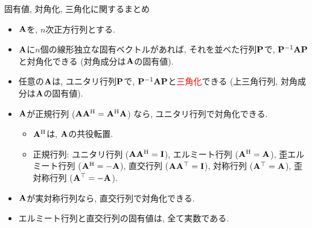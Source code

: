 \documentclass[dvipdfmx,notheorems,t]{beamer}
\begin{document}
\begin{frame}{固有値, 対角化, 三角化に関するまとめ}
\begin{itemize}
  \item $\vb{A}$を, $n$次正方行列とする.
  \item $\vb{A}$に$n$個の線形独立な固有ベクトルがあれば, それを並べた行列$\vb{P}$で,
  $\vb{P}^{-1} \vb{A} \vb{P}$と対角化できる (対角成分は$\vb{A}$の固有値).
  \item 任意の$\vb{A}$は, ユニタリ行列$\vb{P}$で, $\vb{P}^{-1} \vb{A} \vb{P}$と\textcolor{red}{三角化}できる
  (上三角行列, 対角成分は$\vb{A}$の固有値).
  \item $\vb{A}$が正規行列 ($\vb{A} \vb{A}^\mathrm{H} = \vb{A}^\mathrm{H} \vb{A}$) なら,
  ユニタリ行列で対角化できる.
  \begin{itemize}
    \item $\vb{A}^\mathrm{H}$は, $\vb{A}$の共役転置.
    \item 正規行列: ユニタリ行列 ($\vb{A} \vb{A}^\mathrm{H} = \vb{I}$),
    エルミート行列 ($\vb{A}^\mathrm{H} = \vb{A}$), 歪エルミート行列 ($\vb{A}^\mathrm{H} = -\vb{A}$),
    直交行列 ($\vb{A} \vb{A}^\top = \vb{I}$), 対称行列 ($\vb{A}^\top = \vb{A}$), 歪対称行列 ($\vb{A}^\top = -\vb{A}$).
  \end{itemize}
  \item $\vb{A}$が実対称行列なら, 直交行列で対角化できる.
  \item エルミート行列と直交行列の固有値は, 全て実数である.
\end{itemize}
\end{frame}

\end{document}
